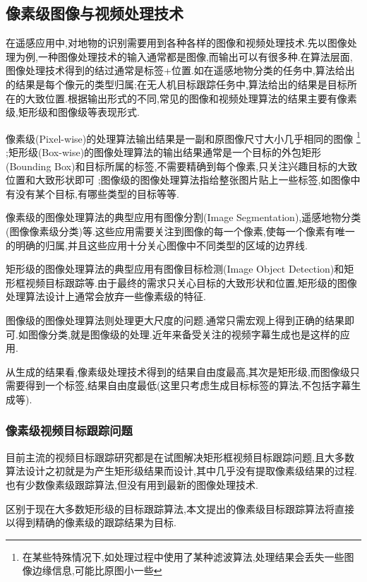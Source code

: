 \subsection{像素级图像与视频处理技术}
在遥感应用中,对地物的识别需要用到各种各样的图像和视频处理技术.先以图像处理为例,一种图像处理技术的输入通常都是图像,而输出可以有很多种.在算法层面,图像处理技术得到的结过通常是标签+位置.如在遥感地物分类的任务中,算法给出的结果是每个像元的类型归属;在无人机目标跟踪任务中,算法给出的结果是目标所在的大致位置.根据输出形式的不同,常见的图像和视频处理算法的结果主要有像素级,矩形级和图像级等表现形式.
\par
像素级(Pixel-wise)的处理算法输出结果是一副和原图像尺寸大小几乎相同的图像
\footnote{在某些特殊情况下,如处理过程中使用了某种滤波算法,处理结果会丢失一些图像边缘信息,可能比原图小一些}
;矩形级(Box-wise)的图像处理算法的输出结果通常是一个目标的外包矩形(Bounding Box)和目标所属的标签,不需要精确到每个像素,只关注兴趣目标的大致位置和大致形状即可
;图像级的图像处理算法指给整张图片贴上一些标签,如图像中有没有某个目标,有哪些类型的目标等等.
\par
像素级的图像处理算法的典型应用有图像分割(Image Segmentation),遥感地物分类(图像像素级分类)等.这些应用需要关注到图像的每一个像素,使每一个像素有唯一的明确的归属,并且这些应用十分关心图像中不同类型的区域的边界线.
\par
矩形级的图像处理算法的典型应用有图像目标检测(Image Object Detection)和矩形框视频目标跟踪等.由于最终的需求只关心目标的大致形状和位置,矩形级的图像处理算法设计上通常会放弃一些像素级的特征.
\par
图像级的图像处理算法则处理更大尺度的问题.通常只需宏观上得到正确的结果即可.如图像分类\supercite{imagenet_cvpr09},就是图像级的处理.近年来备受关注的视频字幕生成\supercite{aswin2019nlp}也是这样的应用.

\par
从生成的结果看,像素级处理技术得到的结果自由度最高,其次是矩形级,而图像级只需要得到一个标签,结果自由度最低(这里只考虑生成目标标签的算法,不包括字幕生成等).

\subsubsection{像素级视频目标跟踪问题}
目前主流的视频目标跟踪研究都是在试图解决矩形框视频目标跟踪问题,且大多数算法设计之初就是为产生矩形级结果而设计,其中几乎没有提取像素级结果的过程.也有少数像素级跟踪算法,但没有用到最新的图像处理技术.
\par
区别于现在大多数矩形级的目标跟踪算法,本文提出的像素级目标跟踪算法将直接以得到精确的像素级的跟踪结果为目标.

